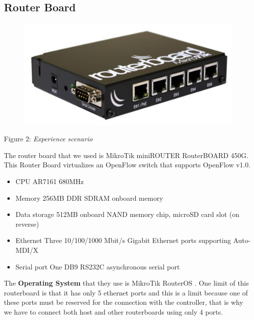 \documentclass[article,10pt]{IEEEtran}
\begin{document}
\subsection{Router Board}
\begin{figure}[!h]
  \centering
  \includegraphics[scale=0.30]{images/rboard.png}
  
  \label{fig:topo}
\end{figure}
\begin{center}
 {Figure 2: \emph{Experience scenario}}
\end{center}



The router board that we used is MikroTik miniROUTER RouterBOARD 450G. This Router Board virtualizes an OpenFlow switch that supports
OpenFlow v1.0\cite{routerboard_doc}.
\begin{itemize}
   \item CPU		AR7161 680MHz
   \item Memory		256MB DDR SDRAM onboard memory
   \item Data storage	512MB onboard NAND memory chip, microSD card slot (on reverse)
   \item Ethernet 	Three 10/100/1000 Mbit/s Gigabit Ethernet ports supporting Auto-MDI/X
   \item Serial port 	One DB9 RS232C asynchronous serial port
\end{itemize}

The \textbf{Operating System} that they use is MikroTik RouterOS \cite{routeboard_software}.
\newline
One limit of this routerboard is that it has only 5 ethernet ports and this is a limit because one of these ports must be
reserved for the connection with the controller, that is why we have to connect both host and other routerboards using only 4 ports.
\end{document}
